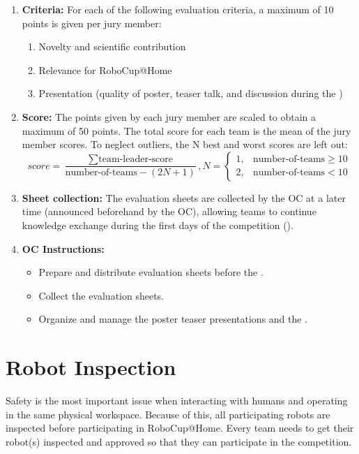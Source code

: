 \begin{enumerate}
	\item \textbf{Criteria:} For each of the following evaluation criteria, a maximum of 10 points is given per jury member:
	\begin{enumerate}
		\item Novelty and scientific contribution
		\item Relevance for RoboCup@Home
		\item Presentation (quality of poster, teaser talk, and discussion during the \PS)
	\end{enumerate}
	\item \textbf{Score:} The points given by each jury member are scaled to obtain a maximum of 50 points. The total score for each team is the mean of the jury member scores. To neglect outliers, the N best and worst scores are left out:
	$$
	score=\frac{\sum \text{team-leader-score}}{\text{number-of-teams}-\left ( 2N+1  \right )},N=\left\{\begin{matrix}
	1, & \text{number-of-teams} \geq 10\\
	2, & \text{number-of-teams} < 10
	\end{matrix}\right.
	$$
	\item \textbf{Sheet collection:} The evaluation sheets are collected by the OC at a later time (announced beforehand by the OC), allowing teams to continue knowledge exchange during the first days of the competition (\SONE).
	\item \textbf{OC Instructions:}
	\begin{itemize}
		\item Prepare and distribute evaluation sheets before the .
		\item Collect the evaluation sheets.
		\item Organize and manage the poster teaser presentations and the \PS.
	\end{itemize}
\end{enumerate}

\section{Robot Inspection}
\label{sec:robot_inspection}
Safety is the most important issue when interacting with humans and operating in the same physical workspace. Because of this, all participating robots are inspected before participating in RoboCup@Home. Every team needs to get their robot(s) inspected and approved so that they can participate in the competition.

